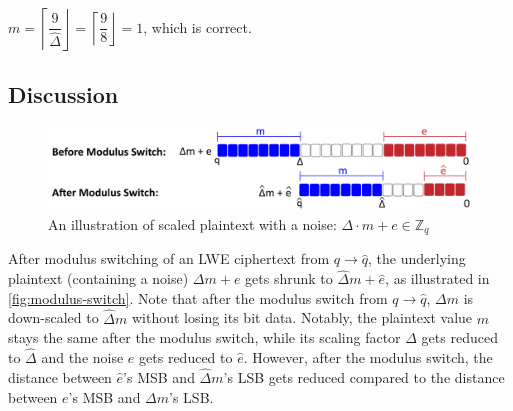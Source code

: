 $ $

$m = \left \lceil \dfrac{9}{\hat \Delta} \right \rfloor = \left \lceil \dfrac{9}{8} \right \rfloor = 1$, which is correct.


\subsection{Discussion}
\label{subsubsec:modulus-switch-lwe-discuss}

\begin{figure}[h!]
    \centering
  \includegraphics[width=0.7\linewidth]{figures/modulus-switching.pdf}
  \caption{An illustration of scaled plaintext with a noise: $\Delta \cdot m + e \in \mathbb{Z}_q$}
  \label{fig:modulus-switch}
\end{figure}

 After modulus switching of an LWE ciphertext from $q \rightarrow \hat{q}$, the underlying plaintext (containing a noise) $\Delta m + e$ gets shrunk to $\hat{\Delta}m + \hat{e}$, as illustrated in \autoref{fig:modulus-switch}. Note that after the modulus switch from $q \rightarrow \hat{q}$, $\Delta m$ is down-scaled to $\hat{\Delta} m$ without losing its bit data. Notably, the plaintext value $m$ stays the same after the modulus switch, while its scaling factor $\Delta$ gets reduced to $\hat{\Delta}$ and the noise $e$ gets reduced to $\hat e$. However, after the modulus switch, the distance between $\hat e$'s MSB and $\hat \Delta m$'s LSB gets reduced compared to the distance between $e$'s MSB and $\Delta m$'s LSB.





